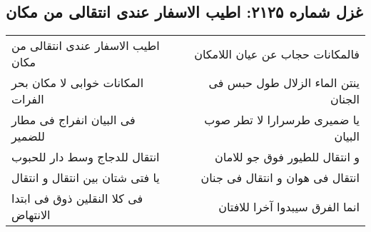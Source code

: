 \begin{center}
\section*{غزل شماره ۲۱۲۵: اطیب الاسفار عندی انتقالی من مکان}
\label{sec:2125}
\begin{longtable}{l p{0.5cm} r}
اطیب الاسفار عندی انتقالی من مکان
&&
فالمکانات حجاب عن عیان اللامکان
\\
المکانات خوابی لا مکان بحر الفرات
&&
ینتن الماء الزلال طول حبس فی الجنان
\\
فی البیان انفراج فی مطار للضمیر
&&
یا ضمیری طرسرارا لا تطر صوب البیان
\\
انتقال للدجاج وسط دار للحبوب
&&
و انتقال للطیور فوق جو للامان
\\
یا فتی شتان بین انتقال و انتقال
&&
انتقال فی هوان و انتقال فی جنان
\\
فی کلا النقلین ذوق فی ابتدا الانتهاض
&&
انما الفرق سیبدوا آخرا للافتان
\\
\end{longtable}
\end{center}
